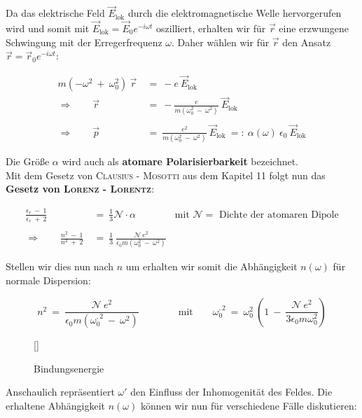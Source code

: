 Da das elektrische Feld $\vec{E}_{\text{lok}}$ durch die elektromagnetische Welle hervorgerufen wird und somit mit $\vec{E}_{\text{lok}} = \vec{E}_0 e^{-i\omega t}$ oszilliert, erhalten wir für $\vec{r}$ eine erzwungene Schwingung mit der Erregerfrequenz $\omega$. Daher wählen wir für $\vec{r}$ den Ansatz $\vec{r}= \vec{r}_0 e^{-i\omega t}$:

\begin{align*}
m\left(-\omega^2 \ + \ \omega_0^2\right) \ \vec{r}  \ &= \ -e \ \vec{E}_{\text{lok}}\\
\Rightarrow \qquad \vec{r}  \ &= \ -\frac{e}{m\left(\omega^2_0 \ - \ \omega^2\right)} \ \vec{E}_{\text{lok}}\\
\ \\
\Rightarrow \qquad \vec{p}  \ &= \ \frac{e^2}{m\left(\omega_0^2 \ - \ \omega^2\right)} \ \vec{E}_{\text{lok}}  \ =: \ \alpha (\omega) \ \epsilon_0 \ \vec{E}_{\text{lok}}
\end{align*}

Die Größe $\alpha$ wird auch als \textbf{atomare Polarisierbarkeit} bezeichnet.\\
Mit dem Gesetz von \textsc{Clausius - Mosotti} aus dem Kapitel 11 folgt nun das \textbf{Gesetz von \textsc{Lorenz - Lorentz}}:

\begin{align*}
\frac{\epsilon_r \ - \ 1}{\epsilon_r \ + \ 2} \ &= \ \frac{1}{3} \mathcal{N} \cdot \alpha \qquad\qquad \text{mit }\mathcal{N}= \text{ Dichte der atomaren Dipole}\\
\ \\
\Rightarrow\qquad \frac{n^2 \ - \ 1}{n^2 \ + \ 2} \ &= \ \frac{1}{3} \ \frac{\mathcal{N} \ e^2}{\epsilon_0 m \left(\omega_0^2 \ - \ \omega^2\right)}
\end{align*}

Stellen wir dies nun nach $n$ um erhalten wir somit die Abhängigkeit $n(\omega)$ für normale Dispersion:

\begin{equation*}
n^2 \ = \ \frac{\mathcal{N} \ e^2}{\epsilon_0 m \left(\omega_0^{,2} \ - \ \omega^2\right)} \qquad \qquad \text{mit} \qquad \omega_0^{,2} \ = \ \omega_0^2\ \left(1 \ - \ \frac{\mathcal{N} \ e^2}{3 \epsilon_0 m \omega_0^2}\right)
\end{equation*}

\begin{wrapfigure}[9]{r}[0cm]{0cm}
	\raisebox{0pt}[\dimexpr{}\baselineskip\relax]{
		\colorbox{hgrey}{
		}
	}
	\caption{Bindungsenergie}
\end{wrapfigure}
Anschaulich repräsentiert $\omega'$ den Einfluss der Inhomogenität des Feldes. Die erhaltene Abhängigkeit $n(\omega)$ können wir nun für verschiedene Fälle diskutieren:

